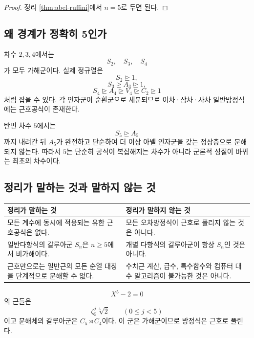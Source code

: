 \begin{proof}
정리 \ref{thm:abel-ruffini}에서 $n=5$로 두면 된다.
\end{proof}

\subsection{왜 경계가 정확히 5인가}

차수 $2,3,4$에서는
\[
  S_2,\quad S_3,\quad S_4
\]
가 모두 가해군이다. 실제 정규열은
\[
  S_2\trianglerighteq1,
\]
\[
  S_3\trianglerighteq A_3\trianglerighteq1,
\]
\[
  S_4\trianglerighteq A_4\trianglerighteq V_4
  \trianglerighteq C_2\trianglerighteq1
\]
처럼 잡을 수 있다. 각 인자군이 순환군으로 세분되므로 이차·삼차·사차 일반방정식에는 근호공식이 존재한다.

반면 차수 $5$에서는
\[
  S_5\trianglerighteq A_5
\]
까지 내려간 뒤 $A_5$가 완전하고 단순하여 더 이상 아벨 인자군을 갖는 정상층으로 분해되지 않는다. 따라서 $5$는 단순히 공식이 복잡해지는 차수가 아니라 군론적 성질이 바뀌는 최초의 차수이다.

\subsection{정리가 말하는 것과 말하지 않는 것}

\begin{center}
\renewcommand{\arraystretch}{1.2}
\begin{tabular}{p{}p{}}
\toprule
\textbf{정리가 말하는 것} & \textbf{정리가 말하지 않는 것} \\
\midrule
모든 계수에 동시에 적용되는 유한 근호공식은 없다. & 모든 오차방정식이 근호로 풀리지 않는 것은 아니다. \\
일반다항식의 갈루아군 $S_n$은 $n\ge5$에서 비가해이다. & 개별 다항식의 갈루아군이 항상 $S_n$인 것은 아니다. \\
근호만으로는 일반근의 모든 순열 대칭을 단계적으로 분해할 수 없다. & 수치근 계산, 급수, 특수함수와 컴퓨터 대수 알고리즘이 불가능한 것은 아니다. \\
\bottomrule
\end{tabular}
\end{center}

\begin{example}
\[
  X^5-2=0
\]
의 근들은
\[
  \zeta_5^j\sqrt[5]{2}
  \qquad(0\le j<5)
\]
이고 분해체의 갈루아군은 $C_5\rtimes C_4$이다. 이 군은 가해군이므로 방정식은 근호로 풀린다.
\end{example}

